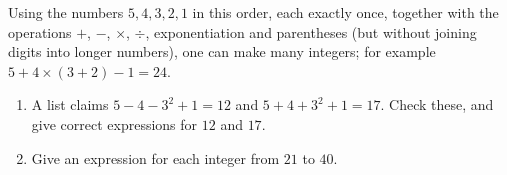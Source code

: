 Using the numbers $5,4,3,2,1$ in this order, each exactly once, together with the operations $+$, $-$, $\times$, $\div$, exponentiation and parentheses (but without joining digits into longer numbers), one can make many integers; for example $5+4\times(3+2)-1=24$.
\begin{enumerate}
\item[(a)] A list claims $5-4-3^2+1=12$ and $5+4+3^2+1=17$. Check these, and give correct expressions for $12$ and $17$.
\item[(b)] Give an expression for each integer from $21$ to $40$.
\end{enumerate}

